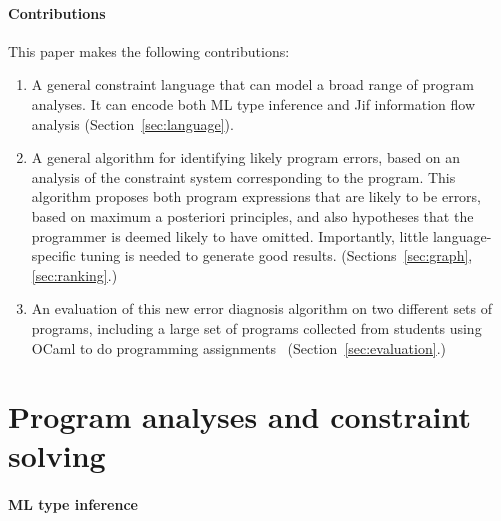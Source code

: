 \paragraph{Contributions}

This paper makes the following contributions:

\begin{enumerate}
\item
A general constraint language that can model a broad
range of program analyses. It can encode both ML type
inference and Jif information flow analysis
(Section~\ref{sec:language}).

\item
A general algorithm for identifying likely program errors,
based on an analysis of the constraint system corresponding
to the program. This algorithm proposes both program expressions
that are likely to be errors, based on maximum a posteriori
principles, and also hypotheses that the programmer is
deemed likely to have omitted. Importantly,
little language-specific tuning is needed to generate good results.
(Sections~\ref{sec:graph}, \ref{sec:ranking}.)

\item
An evaluation of this new error diagnosis algorithm on two
different sets of programs, including a large set of programs
collected from students using OCaml to do
programming assignments~\cite{lerner:pldi07}
(Section~\ref{sec:evaluation}.)

\end{enumerate}

\section{Program analyses and constraint solving}



\paragraph{ML type inference}

